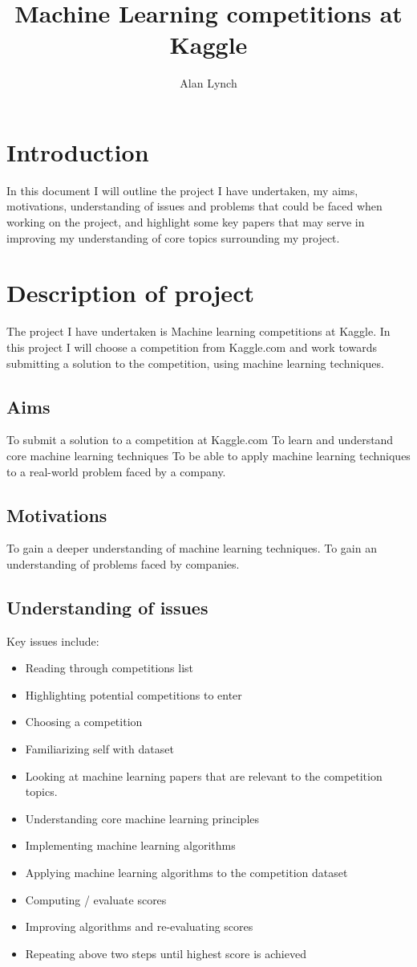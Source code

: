 \documentclass[proposal]{cmpreport}
\title{Machine Learning competitions at Kaggle}
\author{Alan Lynch}
\begin{document}
\section{Introduction}
In this document I will outline the project I have undertaken, my aims, motivations, understanding of issues and problems that could be faced when working on the project, and highlight some key papers that may serve in improving my understanding of core topics surrounding my project. 
\section{Description of project}
The project I have undertaken is Machine learning competitions at Kaggle. In this project I will choose a competition from Kaggle.com and work towards submitting a solution to the competition, using machine learning techniques.
\subsection{Aims}
To submit a solution to a competition at Kaggle.com
\newline
To learn and understand core machine learning techniques
\newline
To be able to apply machine learning techniques to a real-world problem faced by a company.
\subsection{Motivations}
To gain a deeper understanding of machine learning techniques.
\newline
To gain an understanding of problems faced by companies.
\subsection{Understanding of issues}
Key issues include:
\begin{itemize}
	\item Reading through competitions list
    \item Highlighting potential competitions to enter
    \item Choosing a competition
    \item Familiarizing self with dataset
    \item Looking at machine learning papers that are relevant to the competition topics.
    \item Understanding core machine learning principles
    \item Implementing machine learning algorithms
    \item Applying machine learning algorithms to the competition dataset
    \item Computing / evaluate scores
    \item Improving algorithms and re-evaluating scores
    \item Repeating above two steps until highest score is achieved
\end{itemize}
\end{document}
